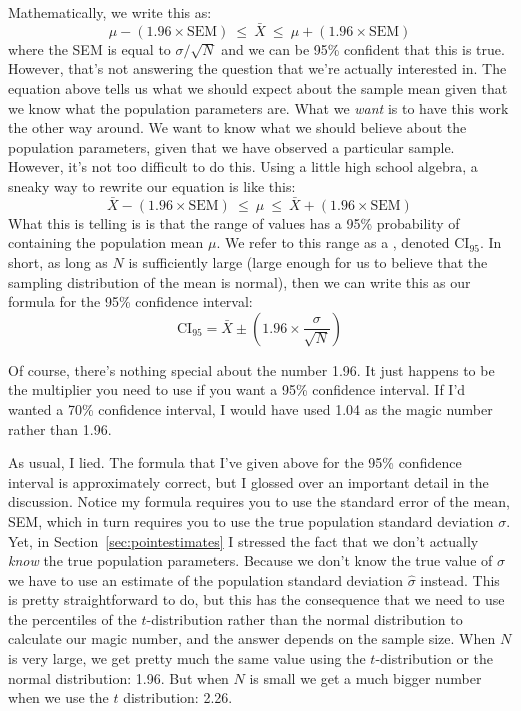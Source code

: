 \vspace{0.5cm}
\begin{mdframed}[style=MyFrame,nobreak=true]
Mathematically, we write this as:
$$
\mu - \left( 1.96 \times \mbox{SEM} \right) \ \leq \  \bar{X}\  \leq \  \mu + \left( 1.96 \times \mbox{SEM} \right) 
$$
where the SEM is equal to $\sigma / \sqrt{N}$ and we can be 95\% confident that this is true. However, that's not answering the question that we're actually interested in. The equation above tells us what we should expect about the sample mean given that we know what the population parameters are. What we {\it want} is to have this work the other way around. We want to know what we should believe about the population parameters, given that we have observed a particular sample. However, it's not too difficult to do this. Using a little high school algebra, a sneaky way to rewrite our equation is like this:
$$
\bar{X} -  \left( 1.96 \times \mbox{SEM} \right) \ \leq \ \mu  \ \leq  \ \bar{X} +  \left( 1.96 \times \mbox{SEM}\right)
$$
What this is telling is is that the range of values has a 95\% probability of containing the population mean $\mu$. We refer to this range as a , denoted $\mbox{CI}_{95}$. In short, as long as $N$ is sufficiently large (large enough for us to believe that the sampling distribution of the mean is normal), then we can write this as our formula for the 95\% confidence interval:
$$
\mbox{CI}_{95} = \bar{X} \pm \left( 1.96 \times \frac{\sigma}{\sqrt{N}} \right)
$$
\end{mdframed}

Of course, there's nothing special about the number 1.96. It just happens to be the multiplier you need to use if you want a 95\% confidence interval. If I'd wanted a 70\% confidence interval, I would have used 1.04 as the magic number rather than 1.96.


As usual, I lied. The formula that I've given above for the 95\% confidence interval is approximately correct, but I glossed over an important detail in the discussion. Notice my formula requires you to use the standard error of the mean, SEM, which in turn requires you to use the true population standard deviation $\sigma$. Yet, in Section~\ref{sec:pointestimates} I stressed the fact that we don't actually {\it know} the true population parameters. Because we don't know the true value of $\sigma$ we have to use an estimate of the population standard deviation $\hat{\sigma}$ instead. This is pretty straightforward to do, but this has the consequence that we need to use the percentiles of the $t$-distribution rather than the normal distribution to calculate our magic number, and the answer depends on the sample size. When $N$ is very large, we get pretty much the same value using the $t$-distribution or the normal distribution: 1.96. But when $N$ is small we get a much bigger number when we use the $t$ distribution: 2.26.

